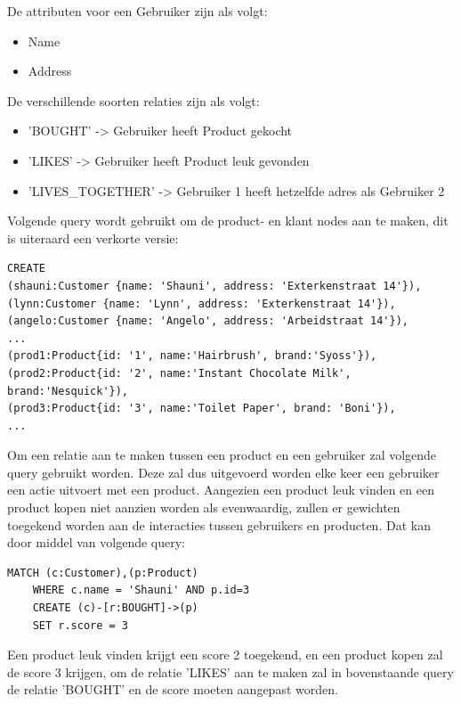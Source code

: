 De attributen voor een Gebruiker zijn als volgt:
\begin{itemize}
	\item Name
	\item Address
\end{itemize}

De verschillende soorten relaties zijn als volgt:
\begin{itemize}
	\item 'BOUGHT' -> Gebruiker heeft Product gekocht
	\item 'LIKES' -> Gebruiker heeft Product leuk gevonden
	\item 'LIVES\_TOGETHER' -> Gebruiker 1 heeft hetzelfde adres als Gebruiker 2
\end{itemize}

Volgende query wordt gebruikt om de product- en klant nodes aan te maken, dit is uiteraard een verkorte versie:

\begin{lstlisting}[caption={Neo4j query voor het aanmaken van producten en klanten}]
CREATE 
(shauni:Customer {name: 'Shauni', address: 'Exterkenstraat 14'}),
(lynn:Customer {name: 'Lynn', address: 'Exterkenstraat 14'}),
(angelo:Customer {name: 'Angelo', address: 'Arbeidstraat 14'}), 
...
(prod1:Product{id: '1', name:'Hairbrush', brand:'Syoss'}), 
(prod2:Product{id: '2', name:'Instant Chocolate Milk', brand:'Nesquick'}), 
(prod3:Product{id: '3', name:'Toilet Paper', brand: 'Boni'}), 
...
\end{lstlisting}

Om een relatie aan te maken tussen een product en een gebruiker zal volgende query gebruikt worden. Deze zal dus uitgevoerd worden elke keer een gebruiker een actie uitvoert met een product.
Aangezien een product leuk vinden en een product kopen niet aanzien worden als evenwaardig, zullen er gewichten toegekend worden aan de interacties tussen gebruikers en producten.  Dat kan door middel van volgende query:

\begin{lstlisting}[caption={Neo4j query voor het aanmaken van een relatie tussen een product en een klant}]
	MATCH (c:Customer),(p:Product) 
	WHERE c.name = 'Shauni' AND p.id=3 
	CREATE (c)-[r:BOUGHT]->(p) 
	SET r.score = 3
\end{lstlisting}

Een product leuk vinden krijgt een score 2 toegekend, en een product kopen zal de score 3 krijgen, om de relatie 'LIKES' aan te maken zal in bovenstaande query de relatie 'BOUGHT' en de score moeten aangepast worden.

